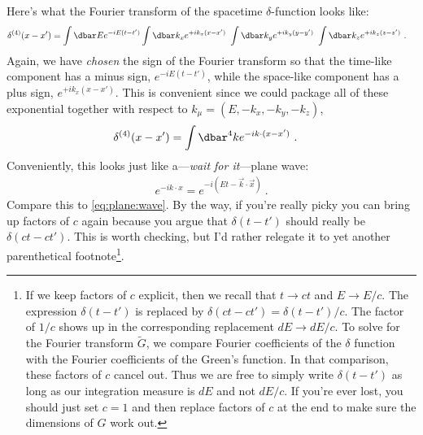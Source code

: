 Here's what the Fourier transform of the spacetime $\delta$-function looks like:
\begin{align}
  \delta^{(4)}(x-x') &=
  \int \dbar E e^{-iE(t-t')}
  \int \dbar k_x e^{+ik_x(x-x')}\
  \int \dbar k_y e^{+ik_y(y-y')}\
  \int \dbar k_z e^{+ik_z(z-z')} \ .
\end{align}
Again, we have \emph{chosen} the sign of the Fourier transform so that the time-like component has a minus sign, $e^{-iE(t-t')}$, while the space-like component has a plus sign, $e^{+ik_x(x-x')}$. This is convenient since we could package all of these exponential together with respect to $k_\mu = (E, -k_x, -k_y, -k_z)$,
\begin{align}
  \delta^{(4)}(x-x') &=
  \int \dbar^4k e^{-ik\cdot (x-x')} \ .
  \label{eq:4D:delta:Fourier}
\end{align}
Conveniently, this looks just like a---\emph{wait for it}---plane wave:
\begin{align}
  e^{-ik\cdot x} = e^{-i\left(Et - \vec{k}\cdot\vec{x}\right)} \ .
\end{align}
Compare this to \eqref{eq:plane:wave}. By the way, if you're really picky you can bring up factors of $c$ again because you argue that $\delta(t-t')$ should really be $\delta(ct-ct')$. This is worth checking, but I'd rather relegate it to yet another parenthetical footnote\footnote{
  If we keep factors of $c$ explicit, then we recall that $t\to ct$ and $E\to E/c$. The expression $\delta(t-t')$ is replaced by $\delta(ct-ct') = \delta(t-t')/c$. The factor of $1/c$ shows up in the corresponding replacement $dE \to dE/c$. To solve for the Fourier transform $\tilde G$, we compare Fourier coefficients of the $\delta$ function with the Fourier coefficients of the Green's function. In that comparison, these factors of $c$ cancel out. Thus we are free to simply write $\delta(t-t')$ as long as our integration measure is $dE$ and not $dE/c$. If you're ever lost, you should just set $c=1$ and then replace factors of $c$ at the end to make sure the dimensions of $G$ work out.
}.

